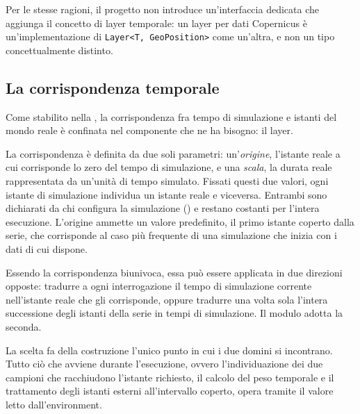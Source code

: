 Per le stesse ragioni, il progetto non introduce un'interfaccia dedicata che aggiunga il
concetto di layer temporale: un layer per dati Copernicus è un'implementazione di
\texttt{Layer<T, GeoPosition>} come un'altra, e non un tipo concettualmente distinto.

\subsection{La corrispondenza temporale}
\label{sec:corrispondenza-temporale}

Come stabilito nella , la corrispondenza fra tempo
di simulazione e istanti del mondo reale è confinata nel componente che ne ha bisogno: il layer.

La corrispondenza è definita da due soli parametri: un'\emph{origine}, l'istante
reale a cui corrisponde lo zero del tempo di simulazione, e una \emph{scala}, la
durata reale rappresentata da un'unità di tempo simulato. Fissati questi due valori,
ogni istante di simulazione individua un istante reale e viceversa. Entrambi sono
dichiarati da chi configura la simulazione () e restano
costanti per l'intera esecuzione. L'origine ammette un valore predefinito, il primo
istante coperto dalla serie, che corrisponde al caso più frequente di una
simulazione che inizia con i dati di cui dispone.

Essendo la corrispondenza biunivoca, essa può essere applicata in due
direzioni opposte: tradurre a ogni interrogazione il tempo di simulazione corrente
nell'istante reale che gli corrisponde, oppure tradurre una volta sola l'intera
successione degli istanti della serie in tempi di simulazione. Il modulo adotta la
seconda.

La scelta fa della costruzione l'unico punto in cui i due domini si incontrano.
Tutto ciò che avviene durante l'esecuzione, ovvero l'individuazione dei due campioni
che racchiudono l'istante richiesto, il calcolo del peso temporale e il trattamento
degli istanti esterni all'intervallo coperto, opera tramite
il valore letto dall'environment.

